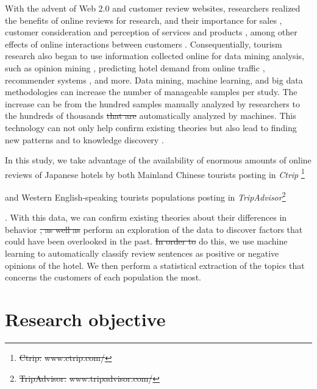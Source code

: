 \documentclass[smallextended,natbib]{svjour3}       %
\providecommand{\DIFadd}[1]{{\protect\color{blue}\uwave{#1}}} %
\providecommand{\DIFdel}[1]{{\protect\color{red}\sout{#1}}}                      %
\providecommand{\DIFaddbegin}{} %
\providecommand{\DIFaddend}{} %
\providecommand{\DIFdelbegin}{} %
\providecommand{\DIFdelend}{} %
\begin{document}
  With the advent of Web 2.0 and customer review websites, researchers realized the benefits of online reviews for research, and their importance for sales  \cite[][]{ye2009, basuroy2003}, customer consideration \cite[][]{vermeulen2009} and perception of services and products \cite[][]{browning2013}, among other effects of online interactions between customers \cite[e.g.][]{xiang2010, ren2019}. Consequentially, tourism research also began to use information collected online for data mining analysis, such as opinion mining \cite[e.g.][]{hu2017436}, predicting hotel demand from online traffic \cite[][]{yang2014}, recommender systems \cite[e.g.][]{loh2003}, and more. Data mining, machine learning, and big data methodologies can increase the number of manageable samples per study. The increase can be from the hundred samples manually analyzed by researchers to the hundreds of thousands \DIFdelbegin \DIFdel{that are }\DIFdelend automatically analyzed by machines. This technology can not only help confirm existing theories but also lead to finding new patterns and to knowledge discovery \cite[][]{fayyad1996data}. 

  In this study, we take advantage of the availability of enormous amounts of online reviews of Japanese hotels by both Mainland Chinese tourists posting in \textit{Ctrip} \DIFdelbegin \footnote{%
\DIFdel{Ctrip: }%
\DIFdel{www.ctrip.com/}%
} %
\addtocounter{footnote}{-1}%
\DIFdelend and Western English-speaking tourists populations posting in \textit{TripAdvisor}\DIFdelbegin \footnote{%
\DIFdel{TripAdvisor: }%
\DIFdel{www.tripadvisor.com/}%
}%
\addtocounter{footnote}{-1}%
\DIFdelend . With this data, we can confirm existing theories about their differences in behavior \DIFdelbegin \DIFdel{, as well as }\DIFdelend \DIFaddbegin \DIFadd{and }\DIFaddend perform an exploration of the data to discover factors that could have been overlooked in the past. \DIFdelbegin \DIFdel{In order to }\DIFdelend \DIFaddbegin \DIFadd{To }\DIFaddend do this, we use machine learning to automatically classify review sentences as positive or negative opinions of the hotel. We then perform a statistical extraction of the topics that concerns the customers of each population the most.

\section{Research objective}\label{research_objective}
\end{document}
